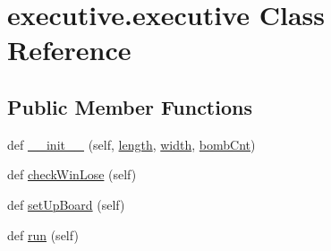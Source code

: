 \hypertarget{classexecutive_1_1executive}{}\section{executive.\+executive Class Reference}
\label{classexecutive_1_1executive}
\subsection*{Public Member Functions}
\begin{DoxyCompactItemize}
\item 
def \mbox{\hyperlink{classexecutive_1_1executive_a7456b110c146af5391ea26770144b461}{\+\_\+\+\_\+init\+\_\+\+\_\+}} (self, \mbox{\hyperlink{classexecutive_1_1executive_afcb8b34bb0f032c2ffae4573b9a42613}{length}}, \mbox{\hyperlink{classexecutive_1_1executive_a3ffae68509fd1c2b2043198df88b913c}{width}}, \mbox{\hyperlink{classexecutive_1_1executive_ab749a7a52e7361de73ee03285a25e804}{bomb\+Cnt}})
\item 
def \mbox{\hyperlink{classexecutive_1_1executive_a944d536ab4e80df2ef4c0494d7ea9f19}{check\+Win\+Lose}} (self)
\item 
def \mbox{\hyperlink{classexecutive_1_1executive_ae2161d95542ae653323bbfb9ae0ac27b}{set\+Up\+Board}} (self)
\item 
def \mbox{\hyperlink{classexecutive_1_1executive_abe92cddf119081cac6c747858df061d7}{run}} (self)
\end{DoxyCompactItemize}
